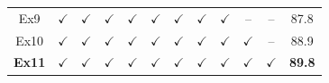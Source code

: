 \begin{minipage}[t]{0.5185\textwidth}
{{\begin{tabular}{c|cc|cccc|cccc|c}
        Ex9 & $\checkmark$ & $\checkmark$
        & $\checkmark$ & $\checkmark$ & $\checkmark$ & $\checkmark$
        & $\checkmark$ & $\checkmark$ & -- & --
        & \cellcolor{blue4}87.8 \\
        Ex10 & $\checkmark$ & $\checkmark$
        & $\checkmark$ & $\checkmark$ & $\checkmark$ & $\checkmark$
        & $\checkmark$ & $\checkmark$ & $\checkmark$ & --
        & \cellcolor{blue4}88.9 \\
        \rowcolor{tablehead}
        \textbf{Ex11} & $\checkmark$ & $\checkmark$
        & $\checkmark$ & $\checkmark$ & $\checkmark$ & $\checkmark$
        & $\checkmark$ & $\checkmark$ & $\checkmark$ & $\checkmark$
        & \cellcolor{blue4}\textbf{89.8} \\
        \bottomrule
    \end{tabular}%
    }}
\end{minipage}
